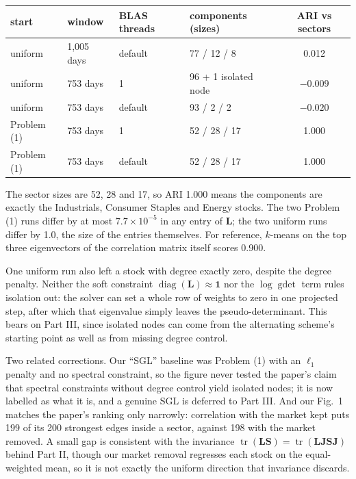 \documentclass[11pt,a4paper]{article}
\newcommand{\Lap}{\mathbf{L}}
\newcommand{\Smat}{\mathbf{S}}
\newcommand{\one}{\mathbf{1}}
\newcommand{\tr}{\operatorname{tr}}
\begin{document}
\begin{center}
\small
\begin{tabular}{llllc}
\toprule
start & window & BLAS threads & components (sizes) & ARI vs sectors \\
\midrule
uniform & 1{,}005 days & default & 77 / 12 / 8 & 0.012 \\
uniform & 753 days & 1 & 96 + 1 isolated node & $-0.009$ \\
uniform & 753 days & default & 93 / 2 / 2 & $-0.020$ \\
Problem (1) & 753 days & 1 & 52 / 28 / 17 & 1.000 \\
Problem (1) & 753 days & default & 52 / 28 / 17 & 1.000 \\
\bottomrule
\end{tabular}
\end{center}

The sector sizes are 52, 28 and 17, so ARI 1.000 means the components are exactly the
Industrials, Consumer Staples and Energy stocks. The two Problem (1) runs differ by at
most $7.7\times10^{-5}$ in any entry of $\Lap$; the two uniform runs differ by 1.0, the size of the entries themselves.
For reference, $k$-means on the top three eigenvectors of the correlation matrix itself scores 0.900.

One uniform run also left a stock with degree exactly zero, despite the degree penalty. Neither the soft constraint $\operatorname{diag}(\Lap)\approx\one$ nor the $\log\operatorname{gdet}$ term rules isolation out: the solver can set a whole row of weights to zero in one projected step, after which that eigenvalue simply leaves the pseudo-determinant. This bears on Part III, since isolated nodes can come from the alternating scheme's starting point as well as from missing degree control.

Two related corrections. Our ``SGL'' baseline was Problem (1) with an $\ell_1$
penalty and no spectral constraint, so the figure never tested the paper's claim that
spectral constraints without degree control yield isolated nodes; it is now labelled
as what it is, and a genuine SGL is deferred to Part III. And our Fig.~1 matches the
paper's ranking only narrowly: correlation with the market kept puts 199 of its 200
strongest edges inside a sector, against 198 with the market removed. A small gap is
consistent with the invariance $\tr(\Lap\Smat)=\tr(\Lap\mathbf{J}\Smat\mathbf{J})$
behind Part II, though our market removal regresses each stock on the equal-weighted
mean, so it is not exactly the uniform direction that invariance discards.
\end{document}

